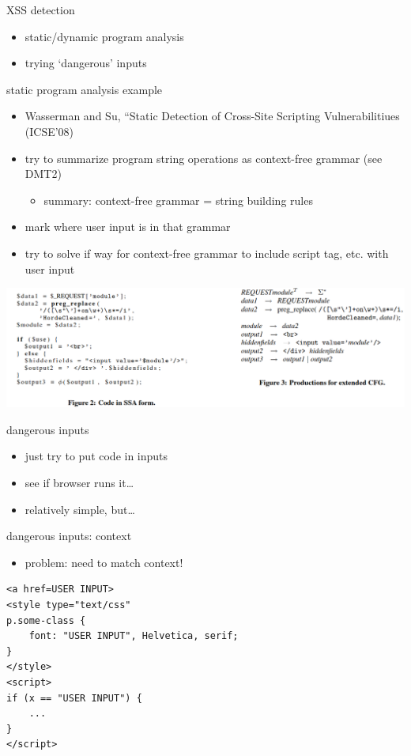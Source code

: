 \begin{frame}{XSS detection}
    \begin{itemize}
    \item static/dynamic program analysis
    \item trying `dangerous' inputs
    \end{itemize}
\end{frame}

\begin{frame}{static program analysis example}
    \begin{itemize}
    \item Wasserman and Su, ``Static Detection of Cross-Site Scripting Vulnerabilitiues (ICSE'08)
    \item try to summarize program string operations as context-free grammar (see DMT2)
        \begin{itemize}
        \item summary: context-free grammar = string building rules
        \end{itemize}
    \item mark where user input is in that grammar
    \item try to solve if way for context-free grammar to include script tag, etc. with user input
    \end{itemize}
\includegraphics[width=\textwidth]{wassermann-fig1-2}
\end{frame}

\begin{frame}{dangerous inputs}
    \begin{itemize}
    \item just try to put code in inputs
    \item see if browser runs it\ldots
    \vspace{.5cm}
    \item relatively simple, but\ldots
    \end{itemize}
\end{frame}

\begin{frame}[fragile]{dangerous inputs: context}
\begin{itemize}
\item problem: need to match context!
\end{itemize}
\begin{Verbatim}[fontsize=\small]
<a href=USER INPUT>
<style type="text/css"
p.some-class {
    font: "USER INPUT", Helvetica, serif;
}
</style>
<script>
if (x == "USER INPUT") {
    ...
}
</script>
\end{Verbatim}
\end{frame}


